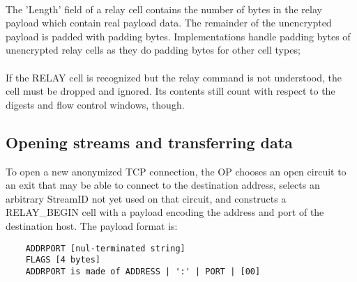 \paragraph{}
The 'Length' field of a relay cell contains the number of bytes in
the relay payload which contain real payload data. The remainder of
the unencrypted payload is padded with padding bytes. Implementations
handle padding bytes of unencrypted relay cells as they do padding
bytes for other cell types;

\paragraph{}
If the RELAY cell is recognized but the relay command is not
understood, the cell must be dropped and ignored. Its contents
still count with respect to the digests and flow control windows, though.

\subsection{Opening streams and transferring data}
To open a new anonymized TCP connection, the OP chooses an open
circuit to an exit that may be able to connect to the destination
address, selects an arbitrary StreamID not yet used on that circuit,
and constructs a RELAY_BEGIN cell with a payload encoding the address
and port of the destination host. The payload format is:
\begin{verbatim}
    ADDRPORT [nul-terminated string]
    FLAGS [4 bytes]
    ADDRPORT is made of ADDRESS | ':' | PORT | [00]
\end{verbatim}


